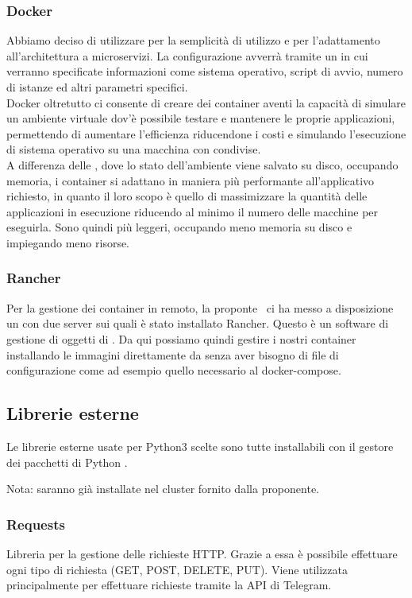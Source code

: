 \subsubsection{Docker}
Abbiamo deciso di utilizzare  per la semplicità di utilizzo e per l'adattamento all'architettura a microservizi.
La configurazione avverrà tramite un  in cui verranno specificate informazioni come sistema operativo, script di avvio,
numero di istanze ed altri parametri specifici. \\
Docker oltretutto ci consente di creare dei container aventi la capacità di simulare un ambiente virtuale dov'è possibile testare e mantenere le proprie applicazioni,
permettendo di aumentare l'efficienza riducendone i costi e simulando l'esecuzione di sistema operativo su una macchina con  condivise.\\
A differenza delle , dove lo stato dell'ambiente viene salvato su disco, occupando memoria, i container si adattano in maniera più performante
all'applicativo richiesto, in quanto il loro scopo è quello di massimizzare la quantità delle applicazioni in esecuzione riducendo al minimo il numero delle macchine per eseguirla.
Sono quindi più leggeri, occupando meno memoria su disco e impiegando meno risorse.

\subsubsection{Rancher}
Per la gestione dei container in remoto, la proponte \II~ci ha messo a disposizione un  con due server sui quali è stato installato Rancher. Questo
è un software di gestione di oggetti di .
Da qui possiamo quindi gestire i nostri container installando le immagini direttamente da  senza aver bisogno di file di configurazione
come ad esempio quello necessario al docker-compose.


\subsection{Librerie esterne}

Le librerie esterne usate per Python3 scelte sono tutte installabili con il gestore dei pacchetti di Python .

Nota: saranno già installate nel cluster fornito dalla proponente.

\subsubsection{Requests}
Libreria per la gestione delle richieste HTTP. Grazie a essa è possibile effettuare ogni tipo di richiesta (GET, POST, DELETE, PUT).
Viene utilizzata principalmente per effettuare richieste tramite la API di Telegram.

